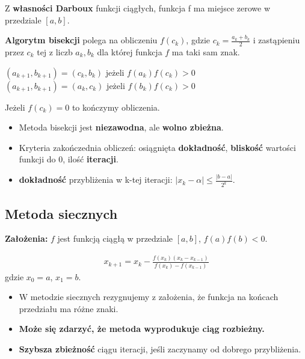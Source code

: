 \documentclass[main.tex]{subfiles}
\begin{document}
    \noindent Z \textbf{własności Darboux} funkcji ciągłych, funkcja f ma miejsce zerowe w przedziale $[a,b]$.

    \begin{definition}
        \textbf{Algorytm bisekcji} polega na obliczeniu $f(c_k)$, gdzie $c_k = \frac{a_k + b_k}{2}$ i zastąpieniu przez
        $c_k$ tej z liczb $a_k, b_k$ dla której funkcja $f$ ma taki sam znak.
        \begin{center}
            $(a_{k+1}, b_{k+1}) = (c_k, b_k)$ jeżeli $f(a_k)f(c_k) > 0$\\
            $(a_{k+1}, b_{k+1}) = (a_k, c_k)$ jeżeli $f(b_k)f(c_k) > 0$
        \end{center}
        Jeżeli $f(c_k) = 0$ to kończymy obliczenia.
    \end{definition}
    \begin{itemize}
        \item Metoda bisekcji jest \textbf{niezawodna}, ale \textbf{wolno zbieżna}.
        \item Kryteria zakończednia obliczeń: osiągnięta \textbf{dokładność}, \textbf{bliskość} wartości funkcji do 0,
        ilość \textbf{iteracji}.
        \item \textbf{dokładność} przybliżenia w k-tej iteracji: $|x_k - \alpha| \leq \frac{|b - a|}{2^k}$.
    \end{itemize}


    \subsection{Metoda siecznych}

    \textbf{Założenia:} $f$ jest funkcją ciągłą w przedziale $[a,b]$, $f(a)f(b) < 0$.

    \begin{align*}
        x_{k+1} = x_k - \frac{f(x_k)(x_k - x_{k-1})}{f(x_k) - f(x_{k-1})}
    \end{align*}
    gdzie $x_0 = a$, $x_1 = b$.

    \begin{itemize}
        \item W metodzie siecznych rezygnujemy z założenia, że funkcja na końcach przedziału ma różne znaki.
        \item \textbf{Może się zdarzyć, że metoda wyprodukuje ciąg rozbieżny.}
        \item \textbf{Szybsza zbieżność} ciągu iteracji, jeśli zaczynamy od dobrego przybliżenia.
    \end{itemize}
\end{document}
